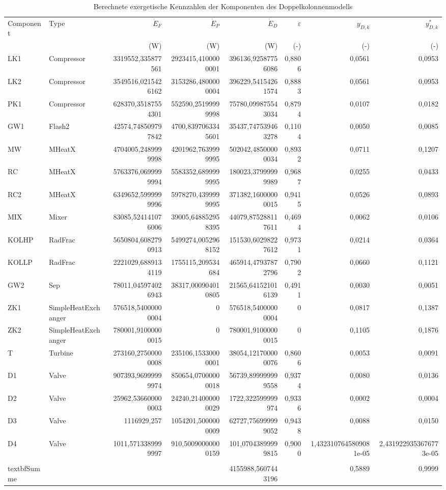 \begin{longtable}{llrrrrrr}
\caption{Berechnete exergetische Kennzahlen der Komponenten des Doppelkolonnenmodells} \\
\hline
Component & Type & $\dot{E}_F$ & $\dot{E}_P$ & $\dot{E}_D$ & $\varepsilon$ & $y_{D,k}$ & $y^*_{D,k}$ \\
 &  & (W) & (W) & (W) & (-) & (-) & (-) \\
\hline
LK1 & Compressor & 3319552,335877561 & 2923415,4100000001 & 396136,92587756086 & 0,8806 & 0,0561 & 0,0953 \\
LK2 & Compressor & 3549516,0215426162 & 3153286,4800000004 & 396229,54154261574 & 0,8883 & 0,0561 & 0,0953 \\
PK1 & Compressor & 628370,35187554301 & 552590,25199999998 & 75780,099875543034 & 0,8794 & 0,0107 & 0,0182 \\
GW1 & Flash2 & 42574,748509797842 & 4700,8397063345601 & 35437,747539463278 & 0,1104 & 0,0050 & 0,0085 \\
MW & MHeatX & 4704005,2489999998 & 4201962,7639999995 & 502042,48500000034 & 0,8932 & 0,0711 & 0,1207 \\
RC & MHeatX & 5763376,0699999994 & 5583352,6899999995 & 180023,37999999989 & 0,9687 & 0,0255 & 0,0433 \\
RC2 & MHeatX & 6349652,5999999996 & 5978270,4399999995 & 371382,16000000015 & 0,9415 & 0,0526 & 0,0893 \\
MIX & Mixer & 83085,524141076006 & 39005,648852958395 & 44079,875288117611 & 0,4694 & 0,0062 & 0,0106 \\
KOLHP & RadFrac & 5650804,6082790913 & 5499274,0052968152 & 151530,60298227612 & 0,9731 & 0,0214 & 0,0364 \\
KOLLP & RadFrac & 2221029,6889134119 & 1755115,209534684 & 465914,47937872796 & 0,7902 & 0,0660 & 0,1121 \\
GW2 & Sep & 78011,045974026943 & 38317,000904010805 & 21565,641521016139 & 0,4911 & 0,0030 & 0,0051 \\
ZK1 & SimpleHeatExchanger & 576518,54000000004 & 0 & 576518,54000000004 & 0 & 0,0817 & 0,1387 \\
ZK2 & SimpleHeatExchanger & 780001,91000000015 & 0 & 780001,91000000015 & 0 & 0,1105 & 0,1876 \\
T & Turbine & 273160,27500000008 & 235106,15330000001 & 38054,121700000076 & 0,8606 & 0,0053 & 0,0091 \\
D1 & Valve & 907393,96999999974 & 850654,07000000018 & 56739,899999999558 & 0,9374 & 0,0080 & 0,0136 \\
D2 & Valve & 25962,536600000003 & 24240,214000000029 & 1722,322599999974 & 0,9336 & 0,0002 & 0,0004 \\
D3 & Valve & 1116929,257 & 1054201,5000000009 & 62727,756999999052 & 0,9438 & 0,0088 & 0,0150 \\
D4 & Valve & 1011,5713389999997 & 910,50090000000159 & 101,07043899999815 & 0,9000 & 1,4323107645809081e-05 & 2,4319229353676773e-05 \\
\hline
\\textbf{Summe} &  &  &  & 4155988,5607443196 &  & 0,5889 & 0,9999\\
\hline
\end{longtable}
